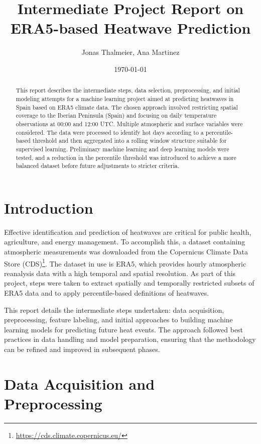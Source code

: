 \documentclass[12pt,a4paper]{article}
\title{Intermediate Project Report on ERA5-based Heatwave Prediction}
\author{Jonas Thalmeier, Ana Martinez}
\date{\today}
\begin{document}
\maketitle

\begin{abstract}
This report describes the intermediate steps, data selection, preprocessing, and initial modeling attempts for a machine learning project aimed at predicting heatwaves in Spain based on ERA5 climate data. The chosen approach involved restricting spatial coverage to the Iberian Peninsula (Spain) and focusing on daily temperature observations at 00:00 and 12:00 UTC. Multiple atmospheric and surface variables were considered. The data were processed to identify hot days according to a percentile-based threshold and then aggregated into a rolling window structure suitable for supervised learning. Preliminary machine learning and deep learning models were tested, and a reduction in the percentile threshold was introduced to achieve a more balanced dataset before future adjustments to stricter criteria.
\end{abstract}

\section{Introduction}
Effective identification and prediction of heatwaves are critical for public health, agriculture, and energy management. To accomplish this, a dataset containing atmospheric measurements was downloaded from the Copernicus Climate Data Store (CDS)\footnote{\url{https://cds.climate.copernicus.eu/}}. The dataset in use is ERA5, which provides hourly atmospheric reanalysis data with a high temporal and spatial resolution. As part of this project, steps were taken to extract spatially and temporally restricted subsets of ERA5 data and to apply percentile-based definitions of heatwaves.

This report details the intermediate steps undertaken: data acquisition, preprocessing, feature labeling, and initial approaches to building machine learning models for predicting future heat events. The approach followed best practices in data handling and model preparation, ensuring that the methodology can be refined and improved in subsequent phases.

\section{Data Acquisition and Preprocessing}
\end{document}
